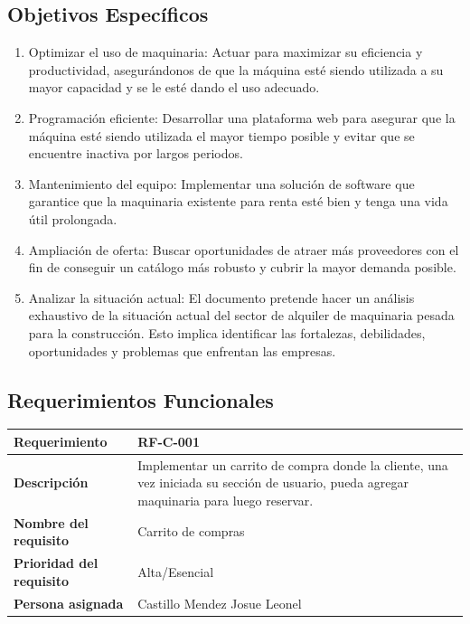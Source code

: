 \documentclass{article}
\begin{document}
\subsection{Objetivos Específicos}
\begin{enumerate}
    \item Optimizar el uso de maquinaria: Actuar para maximizar su eficiencia y productividad, asegurándonos de que la máquina esté siendo utilizada a su mayor capacidad y se le esté dando el uso adecuado.
    \item Programación eficiente: Desarrollar una plataforma web para asegurar que la máquina esté siendo utilizada el mayor tiempo posible y evitar que se encuentre inactiva por largos periodos.
    \item Mantenimiento del equipo: Implementar una solución de software que garantice que la maquinaria existente para renta esté bien y tenga una vida útil prolongada.
    \item Ampliación de oferta: Buscar oportunidades de atraer más proveedores con el fin de conseguir un catálogo más robusto y cubrir la mayor demanda posible.
    \item Analizar la situación actual: El documento pretende hacer un análisis exhaustivo de la situación actual del sector de alquiler de maquinaria pesada para la construcción. Esto implica identificar las fortalezas, debilidades, oportunidades y problemas que enfrentan las empresas.
\end{enumerate}

\subsection{Requerimientos Funcionales}
\begin{center}
\begin{tabular}{|p{3cm}|p{9cm}|}
\hline
\textbf{Requerimiento} & RF-C-001 \\
\hline
\textbf{Descripción} & Implementar un carrito de compra donde la cliente, una vez iniciada su sección de usuario, pueda agregar maquinaria para luego reservar. \\
\hline
\textbf{Nombre del requisito} & Carrito de compras \\
\hline
\textbf{Prioridad del requisito} & Alta/Esencial \\
\hline
\textbf{Persona asignada} & Castillo Mendez Josue Leonel \\
\hline
\end{tabular}
\end{center}
\end{document}
